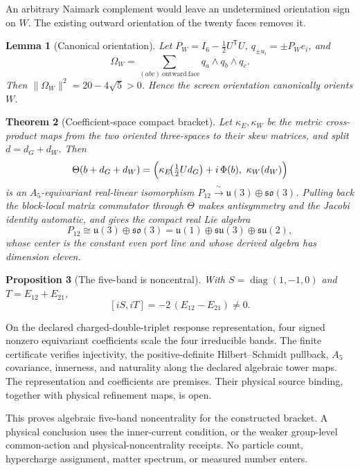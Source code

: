 \documentclass[11pt]{article}
\newtheorem{theorem}{Theorem}[section]
\newtheorem{proposition}[theorem]{Proposition}
\newtheorem{lemma}[theorem]{Lemma}
\begin{document}
An arbitrary Naimark complement would leave an undetermined orientation sign on
\(W\). The existing outward orientation of the twenty faces removes it.

\begin{lemma}[Canonical orientation]
Let \(P_W=I_6-\tfrac12U^{\mathsf T}U\), \(q_{\pm u_i}=\pm P_We_i\), and
\[
  \Omega_W=\sum_{(abc)\ \mathrm{outward\ face}}q_a\wedge q_b\wedge q_c .
\]
Then \(\lVert\Omega_W\rVert^2=20-4\sqrt5>0\). Hence the screen orientation
canonically orients \(W\).
\end{lemma}

\begin{theorem}[Coefficient-space compact bracket]
Let \(\kappa_E,\kappa_W\) be the metric cross-product maps from the two oriented
three-spaces to their skew matrices, and split \(d=d_G+d_W\). Then
\[
  \Theta(b+d_G+d_W)
  =\Bigl(\kappa_E\!\bigl(\tfrac12Ud_G\bigr)+i\,\Phi(b),\ \kappa_W(d_W)\Bigr)
\]
is an \(A_5\)-equivariant real-linear isomorphism
\(P_{12}\xrightarrow{\ \sim\ }\mathfrak u(3)\oplus\mathfrak{so}(3)\). Pulling
back the block-local matrix commutator through \(\Theta\) makes antisymmetry and
the Jacobi identity automatic, and gives the compact real Lie algebra
\[
  P_{12}\cong\mathfrak u(3)\oplus\mathfrak{so}(3)
  =\mathfrak u(1)\oplus\mathfrak{su}(3)\oplus\mathfrak{su}(2),
\]
whose center is the constant even port line and whose derived algebra has
dimension eleven.
\end{theorem}

\begin{proposition}[The five-band is noncentral]
With \(S=\operatorname{diag}(1,-1,0)\) and \(T=E_{12}+E_{21}\),
\[
  [iS,iT]=-2\,(E_{12}-E_{21})\neq0 .
\]
\end{proposition}

On the declared charged-double-triplet response representation, four signed
nonzero equivariant coefficients scale the four irreducible bands. The finite
certificate verifies injectivity, the positive-definite Hilbert--Schmidt
pullback, \(A_5\) covariance, innerness, and naturality along the declared
algebraic tower maps. The representation and coefficients are premises. Their
physical source binding, together with physical refinement maps, is open.

This proves algebraic five-band noncentrality for the constructed bracket. A
physical conclusion uses the inner-current condition, or the weaker
group-level common-action and physical-noncentrality receipts. No particle
count, hypercharge assignment, matter spectrum, or measured number enters.
\end{document}
